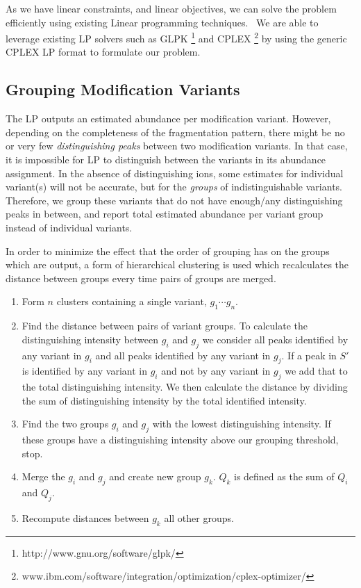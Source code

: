 \documentclass[11pt]{article}
\begin{document}
{As we have linear constraints, and linear objectives, we can solve the
problem efficiently using existing Linear programming techniques.~\cite{Dantzig1998}
We are able to leverage existing LP solvers such as GLPK \footnote[1]{http://www.gnu.org/software/glpk/} and CPLEX \footnote[2]{www.ibm.com/software/integration/optimization/cplex-optimizer/
} by using the generic CPLEX LP format to formulate our problem.

\subsection{Grouping Modification Variants}\label{sec:groupVariants}
The LP outputs an estimated abundance per modification variant. However, depending on the completeness of the fragmentation pattern, there might be no or very few \emph{distinguishing peaks} between two modification variants. In that case, it is impossible for LP to distinguish between the variants in its abundance assignment. In the absence of distinguishing ions, some estimates for individual variant(s) will not be accurate, but for the \emph{groups} of indistinguishable variants. Therefore, we group these variants that do not have enough/any distinguishing peaks in between, and report total estimated abundance per variant group instead of individual variants. 

In order to minimize the effect that the order of grouping has on the groups which are output, a form of hierarchical clustering is used which recalculates the distance between groups every time pairs of groups are merged.

\begin{enumerate}
\item Form $n$ clusters containing a single variant, $g_{1} \cdots g_{n}$.
\item Find the distance between pairs of variant groups. To calculate the distinguishing intensity between $g_{i}$ and $g_{j}$ we consider all peaks identified by any variant in $g_{i}$ and all peaks identified by any variant in $g_{j}$. If a peak in $S'$ is identified by any variant in $g_{i}$ and not by any variant in $g_{j}$ we add that to the total distinguishing intensity. We then calculate the distance by dividing the sum of distinguishing intensity by the total identified intensity.
\item Find the two groups $g_{i}$ and $g_{j}$ with the lowest distinguishing intensity. If these groups have a distinguishing intensity above our grouping threshold, stop.
\item Merge the $g_{i}$ and $g_{j}$ and create new group $g_{k}$. $Q_k$ is defined as the sum of $Q_i$ and $Q_j$.
\item Recompute distances between $g_{k}$ all other groups.
\end{enumerate}

}
\end{document}
